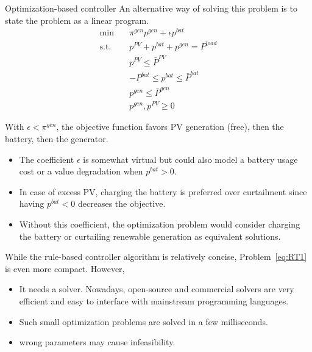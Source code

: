 \begin{frame}[allowframebreaks]{Optimization-based controller}
An alternative way of solving this problem is to state the problem as a linear program. 
\begin{subequations}
	\label{eq:RT1}
    \begin{align}
    \min        \quad  & \pi^{gen} p^{gen}  + \epsilon p^{bat}\\
    \text{s.t.} \quad  & p^{PV}+p^{bat}+p^{gen} = P^{load} \\
                    & p^{PV} \leq \bar{P}^{PV} \\
                    & -\underline{P}^{bat} \leq p^{bat} \leq \bar{P}^{bat} \\
                    & p^{gen} \leq \bar{P}^{gen}\\
                    & p^{gen}, p^{PV} \geq 0
    \end{align}
\end{subequations}

With $\epsilon < \pi^{gen}$, the objective function favors PV generation (free), then the battery, then the generator. 

\begin{itemize}
    \item The coefficient $\epsilon$ is somewhat virtual but could also model a battery usage cost or a value degradation when $p^{bat} > 0$.
    \item In case of excess PV, charging the battery is preferred over curtailment since having $p^{bat} < 0$ decreases the objective. 
    \item Without this coefficient, the optimization problem would consider charging the battery or curtailing renewable generation as equivalent solutions.
\end{itemize}

While the rule-based controller algorithm is relatively concise, Problem~\eqref{eq:RT1} is even more compact. 
However,
\begin{itemize}
    \item It needs a solver. Nowadays, open-source and commercial solvers are very efficient and easy to interface with mainstream programming languages. 
    \item Such small optimization problems are solved in a few milliseconds. 
    \item wrong parameters may cause infeasibility. 
\end{itemize}
\end{frame}


